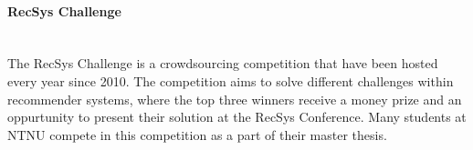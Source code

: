 \paragraph*{RecSys Challenge} \hfill \\
The RecSys Challenge \cite{RECSYS} is a crowdsourcing competition that have been hosted every year since 2010. The competition aims to solve different challenges within recommender systems, where the top three winners receive a money prize and an oppurtunity to present their solution at the RecSys Conference. Many students at NTNU compete in this competition as a part of their master thesis.



